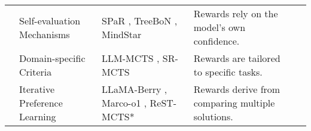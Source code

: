 \begin{table*}[tbp]
{\begin{tabular}{l|lp{26em}ll}
& \cellcolor[rgb]{ .949,  .949,  .949} {Self-evaluation Mechanisms}              & \cellcolor[rgb]{ .949,  .949,  .949} SPaR \cite{DBLP:journals/corr/abs-2412-11605}, TreeBoN \cite{DBLP:journals/corr/abs-2410-16033}, MindStar \cite{DBLP:journals/corr/abs-2405-16265} & \cellcolor[rgb]{ .949,  .949,  .949} Rewards rely on the model's own confidence.    \\ 

&  {Domain-specific Criteria}          &  LLM-MCTS \cite{DBLP:conf/nips/ZhaoLH23}, SR-MCTS \cite{DBLP:journals/corr/abs-2411-04459}  &  Rewards are tailored to specific tasks. \\ 

& \cellcolor[rgb]{ .949,  .949,  .949} {Iterative Preference Learning}     &\cellcolor[rgb]{ .949,  .949,  .949} LLaMA-Berry \cite{DBLP:journals/corr/abs-2410-02884}, Marco-o1 \cite{Marco_o1}, ReST-MCTS* \cite{DBLP:journals/corr/abs-2406-03816}   & \cellcolor[rgb]{ .949,  .949,  .949} Rewards derive from comparing multiple solutions.\\

\bottomrule[1.2pt]
\end{tabular}
}
\label{tab:structure_search}
\end{table*}



